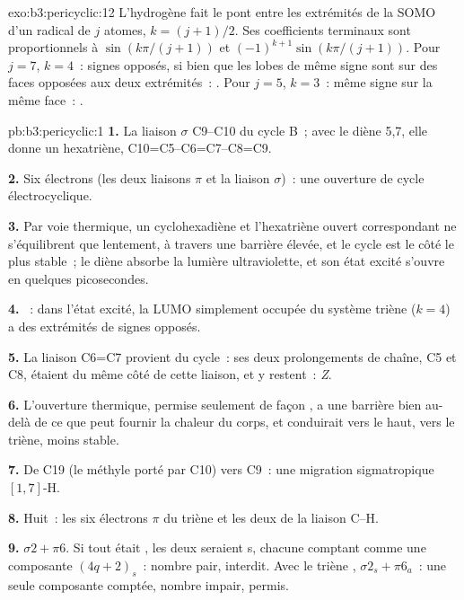 \begin{solution}{exo:b3:pericyclic:12}
L'hydrogène fait le pont entre les extrémités de la SOMO d'un radical de $j$ atomes, $k = (j + 1)/2$. Ses coefficients
terminaux sont proportionnels à $\sin(k\pi/(j + 1))$ et $(-1)^{k+1}\sin(k\pi/(j + 1))$. Pour $j = 7$, $k = 4$~: signes opposés, si bien que
les lobes de même signe sont sur des faces opposées aux deux extrémités~: . Pour
$j = 5$, $k = 3$~: même signe sur la même face~: .
\end{solution}

\begin{solution}{pb:b3:pericyclic:1}
\textbf{1.} La liaison $\sigma$ C9--C10 du cycle B~; avec le diène 5,7, elle donne un hexatriène,
C10=C5--C6=C7--C8=C9.

\textbf{2.} Six électrons (les deux liaisons $\pi$ et la liaison $\sigma$)~: une ouverture de cycle électrocyclique.

\textbf{3.} Par voie thermique, un cyclohexadiène et l'hexatriène ouvert
correspondant ne s'équilibrent que lentement, à travers une barrière
élevée, et le cycle est le côté le plus stable~; le diène absorbe la
lumière ultraviolette, et son état excité s'ouvre en quelques
picosecondes.

\textbf{4.} ~: dans l'état excité, la LUMO simplement occupée du système triène
($k = 4$) a des extrémités de signes opposés.

\textbf{5.} La liaison C6=C7 provient du cycle~: ses deux prolongements de
chaîne, C5 et C8, étaient du même côté de cette liaison, et y restent~:
\textit{Z}.

\textbf{6.} L'ouverture thermique, permise seulement de façon
, a une barrière bien au-delà de ce que peut fournir la chaleur
du corps, et conduirait vers le haut, vers le triène, moins stable.

\textbf{7.} De C19 (le méthyle porté par C10) vers C9~: une migration sigmatropique $[1,7]$-H.

\textbf{8.} Huit~: les six électrons $\pi$ du triène et les deux de la liaison C--H.

\textbf{9.} $\sigma2 + \pi6$. Si tout était , les deux seraient s, chacune comptant comme une composante $(4q + 2)_s$~:
nombre pair, interdit. Avec le triène , $\sigma2_s + \pi6_a$~: une seule composante comptée, nombre impair,
permis.


\end{solution}
